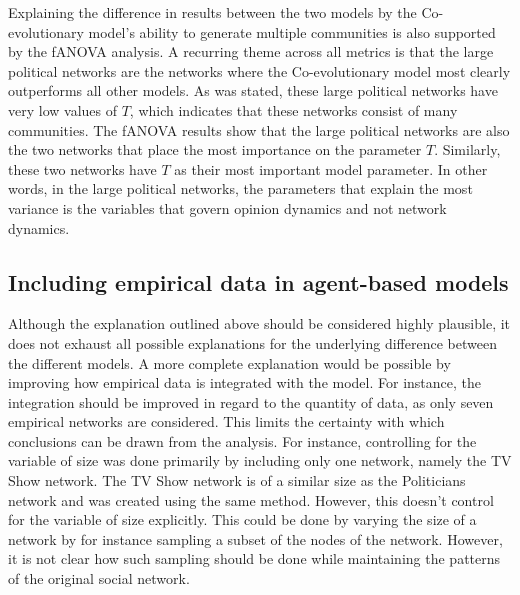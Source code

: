 \documentclass[11pt]{article}
\begin{document}
\noindent Explaining the difference in results between the two models by the Co-evolutionary model's ability to generate multiple communities is also supported by the fANOVA analysis. A recurring theme across all metrics is that the large political networks are the networks where the Co-evolutionary model most clearly outperforms all other models. As was stated, these large political networks have very low values of $T$, which indicates that these networks consist of many communities. 
The fANOVA results show that the large political networks are also the two networks that place the most importance on the parameter $T$. Similarly, these two networks have $T$ as their most important model parameter. In other words, in the large political networks, the parameters that explain the most variance is the variables that govern opinion dynamics and not network dynamics.

\subsection{Including empirical data in agent-based models}
Although the explanation outlined above should be considered highly plausible, it does not exhaust all possible explanations for the underlying difference between the different models. A more complete explanation would be possible by improving how empirical data is integrated with the model. 
For instance, the integration should be improved in regard to the quantity of data, as only seven empirical networks are considered. This limits the certainty with which conclusions can be drawn from the analysis. For instance, controlling for the variable of size was done primarily by including only one network, namely the TV Show network. The TV Show network is of a similar size as the Politicians network and was created using the same method. However, this doesn't control for the variable of size explicitly. This could be done by varying the size of a network by for instance sampling a subset of the nodes of the network. However, it is not clear how such sampling should be done while maintaining the patterns of the original social network. 
\end{document}
